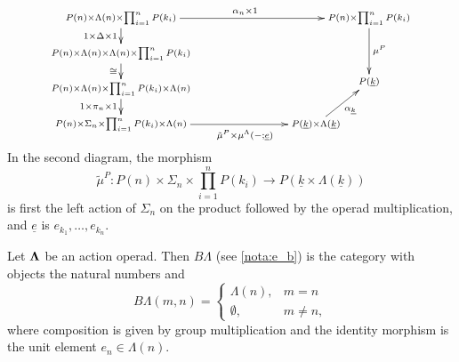   \[
    \xy
      (0,0)*+{\scriptstyle P(n) \times \Lambda(n) \times \prod_{i=1}^n P(k_i) } ="00";
      (0,-10)*+{\scriptstyle P(n) \times \Lambda(n) \times \Lambda(n) \times \prod_{i=1}^n P(k_i) } ="01";
      (0,-20)*+{\scriptstyle P(n) \times \Lambda(n) \times \prod_{i=1}^n P(k_i) \times \Lambda(n) } ="02";
      (0,-30)*+{\scriptstyle P(n) \times \Sigma_{n} \times \prod_{i=1}^n P(k_i) \times \Lambda(n) } ="03";
      (55,-30)*+{\scriptstyle P(\underline{k}) \times \Lambda(\underline{k}) } ="13";
      (70,0)*+{\scriptstyle P(n) \times \prod_{i=1}^n P(k_i) } ="20";
      (70,-18)*+{\scriptstyle P(\underline{k}) } ="21";
      {\ar_{1 \times \Delta \times 1} "00" ; "01"};
      {\ar_{\cong} "01" ; "02"};
      {\ar_{1 \times \pi_{n} \times 1} "02" ; "03"};
      {\ar^{} "03" ; "13"};
      (35,-33)*{\scriptstyle \tilde{\mu}^P \times \mu^\Lambda(-;\underline{e})};
      {\ar_{\alpha_{\underline{k}}} "13" ; "21"};
      {\ar^{\alpha_{n} \times 1} "00" ; "20"};
      {\ar^{\mu^P} "20" ; "21"};
    \endxy
  \]
In the second diagram, the morphism
    \[
        \tilde{\mu}^P \colon P(n) \times \Sigma_n \times \prod_{i=1}^n P(k_i) \rightarrow P(\underline{k} \times \Lambda(\underline{k}))
    \]
is first the left action of $\Sigma_n$ on the product followed by the operad multiplication, and $\underline{e}$ is $e_{k_{1}}, \ldots, e_{k_{n}}$.

\begin{Defi}\label{Defi:actop_to_cat}
Let $\mathbf{\Lambda}$ be an action operad. Then $B\Lambda$ (see \cref{nota:e_b}) is the category with objects the natural numbers and
  \[
    B\Lambda(m,n) = \left\{ \begin{array}{lc}
    \Lambda(n), & m = n \\
    \emptyset, & m \neq n,
    \end{array} \right.
  \]
where composition is given by group multiplication and the identity morphism is the unit element $e_n \in \Lambda(n)$.
\end{Defi}

